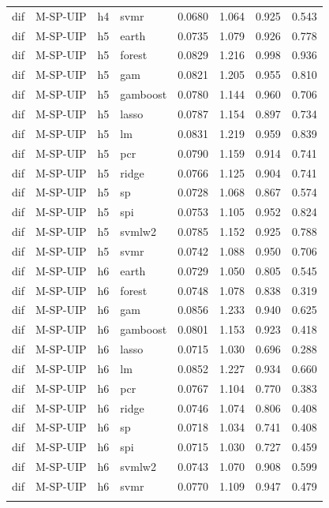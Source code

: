 \begin{ThreePartTable}
\begin{longtable}[t]{llclcccc}
dif & M-SP-UIP & h4 & svmr & 0.0680 & 1.064 & 0.925 & 0.543\\
\addlinespace
dif & M-SP-UIP & h5 & earth & 0.0735 & 1.079 & 0.926 & 0.778\\
dif & M-SP-UIP & h5 & forest & 0.0829 & 1.216 & 0.998 & 0.936\\
dif & M-SP-UIP & h5 & gam & 0.0821 & 1.205 & 0.955 & 0.810\\
dif & M-SP-UIP & h5 & gamboost & 0.0780 & 1.144 & 0.960 & 0.706\\
dif & M-SP-UIP & h5 & lasso & 0.0787 & 1.154 & 0.897 & 0.734\\
dif & M-SP-UIP & h5 & lm & 0.0831 & 1.219 & 0.959 & 0.839\\
dif & M-SP-UIP & h5 & pcr & 0.0790 & 1.159 & 0.914 & 0.741\\
dif & M-SP-UIP & h5 & ridge & 0.0766 & 1.125 & 0.904 & 0.741\\
dif & M-SP-UIP & h5 & sp & 0.0728 & 1.068 & 0.867 & 0.574\\
dif & M-SP-UIP & h5 & spi & 0.0753 & 1.105 & 0.952 & 0.824\\
dif & M-SP-UIP & h5 & svmlw2 & 0.0785 & 1.152 & 0.925 & 0.788\\
dif & M-SP-UIP & h5 & svmr & 0.0742 & 1.088 & 0.950 & 0.706\\
\addlinespace
dif & M-SP-UIP & h6 & earth & 0.0729 & 1.050 & 0.805 & 0.545\\
dif & M-SP-UIP & h6 & forest & 0.0748 & 1.078 & 0.838 & 0.319\\
dif & M-SP-UIP & h6 & gam & 0.0856 & 1.233 & 0.940 & 0.625\\
dif & M-SP-UIP & h6 & gamboost & 0.0801 & 1.153 & 0.923 & 0.418\\
dif & M-SP-UIP & h6 & lasso & 0.0715 & 1.030 & 0.696 & 0.288\\
dif & M-SP-UIP & h6 & lm & 0.0852 & 1.227 & 0.934 & 0.660\\
dif & M-SP-UIP & h6 & pcr & 0.0767 & 1.104 & 0.770 & 0.383\\
dif & M-SP-UIP & h6 & ridge & 0.0746 & 1.074 & 0.806 & 0.408\\
dif & M-SP-UIP & h6 & sp & 0.0718 & 1.034 & 0.741 & 0.408\\
dif & M-SP-UIP & h6 & spi & 0.0715 & 1.030 & 0.727 & 0.459\\
dif & M-SP-UIP & h6 & svmlw2 & 0.0743 & 1.070 & 0.908 & 0.599\\
dif & M-SP-UIP & h6 & svmr & 0.0770 & 1.109 & 0.947 & 0.479\\
\addlinespace

\end{longtable}
\end{ThreePartTable}
